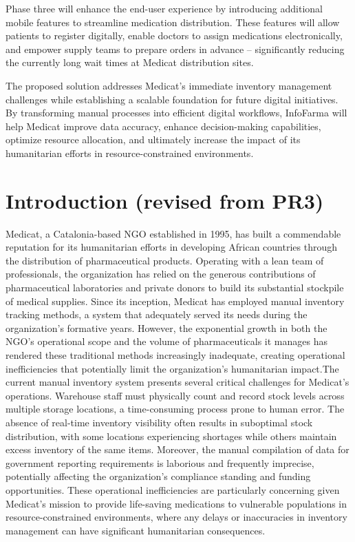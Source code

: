 \documentclass[
]{report}
\begin{document}
Phase three will enhance the end-user experience by introducing
additional mobile features to streamline medication distribution. These
features will allow patients to register digitally, enable doctors to
assign medications electronically, and empower supply teams to prepare
orders in advance -- significantly reducing the currently long wait
times at Medicat distribution sites.

The proposed solution addresses Medicat's immediate inventory management
challenges while establishing a scalable foundation for future digital
initiatives. By transforming manual processes into efficient digital
workflows, InfoFarma will help Medicat improve data accuracy, enhance
decision-making capabilities, optimize resource allocation, and
ultimately increase the impact of its humanitarian efforts in
resource-constrained environments.

\section{Introduction (revised from
PR3)}\label{introduction-revised-from-pr3}

Medicat, a Catalonia-based NGO established in 1995, has built a
commendable reputation for its humanitarian efforts in developing
African countries through the distribution of pharmaceutical products.
Operating with a lean team of professionals, the organization has relied
on the generous contributions of pharmaceutical laboratories and private
donors to build its substantial stockpile of medical supplies. Since its
inception, Medicat has employed manual inventory tracking methods, a
system that adequately served its needs during the organization's
formative years. However, the exponential growth in both the NGO's
operational scope and the volume of pharmaceuticals it manages has
rendered these traditional methods increasingly inadequate, creating
operational inefficiencies that potentially limit the organization's
humanitarian impact.The current manual inventory system presents several
critical challenges for Medicat's operations. Warehouse staff must
physically count and record stock levels across multiple storage
locations, a time-consuming process prone to human error. The absence of
real-time inventory visibility often results in suboptimal stock
distribution, with some locations experiencing shortages while others
maintain excess inventory of the same items. Moreover, the manual
compilation of data for government reporting requirements is laborious
and frequently imprecise, potentially affecting the organization's
compliance standing and funding opportunities. These operational
inefficiencies are particularly concerning given Medicat's mission to
provide life-saving medications to vulnerable populations in
resource-constrained environments, where any delays or inaccuracies in
inventory management can have significant humanitarian consequences.
\end{document}
